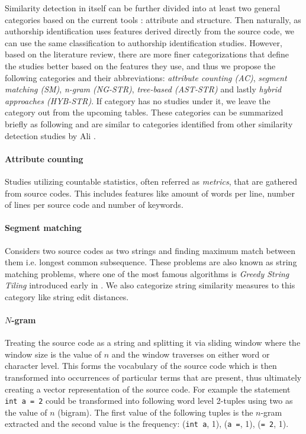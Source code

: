 Similarity detection in itself can be further divided into at least two general categories based on the current tools \cite{RSCAD2016}: attribute and structure. Then naturally, as authorship identification uses features derived directly from the source code, we can use the same classification to authorship identification studies. However, based on the literature review, there are more finer categorizations that define the studies better based on the features they use, and thus we propose the following categories and their abbreviations: \emph{attribute counting (AC)}, \emph{segment matching (SM)}, \emph{n-gram (NG-STR)}, \emph{tree-based (AST-STR)} and lastly \emph{hybrid approaches (HYB-STR)}. If category has no studies under it, we leave the category out from the upcoming tables. These categories can be summarized briefly as following and are similar to categories identified from other similarity detection studies by Ali \etal \cite{OCPOCP2011}. 

\paragraph{Attribute counting}
Studies utilizing countable statistics, often referred as \emph{metrics}, that are gathered from source codes. This includes features like amount of words per line, number of lines per source code and number of keywords.

\paragraph{Segment matching}
Considers two source codes as two strings and finding maximum match between them i.e. longest common subsequence. These problems are also known as string matching problems, where one of the most famous algorithms is \emph{Greedy String Tiling} introduced early in \cite{SSGST1993}. We also categorize string similarity measures to this category like string edit distances.

\paragraph{$N$-gram}
Treating the source code as a string and splitting it via sliding window where the window size is the value of $n$ and the window traverses on either word or character level. This forms the vocabulary of the source code which is then transformed into occurrences of particular terms that are present, thus ultimately creating a vector representation of the source code. For example the statement \texttt{int a = 2} could be transformed into following word level 2-tuples using two as the value of $n$ (bigram). The first value of the following tuples is the $n$-gram extracted and the second value is the frequency: (\texttt{int a}, 1), (\texttt{a =}, 1), (\texttt{= 2}, 1). 

